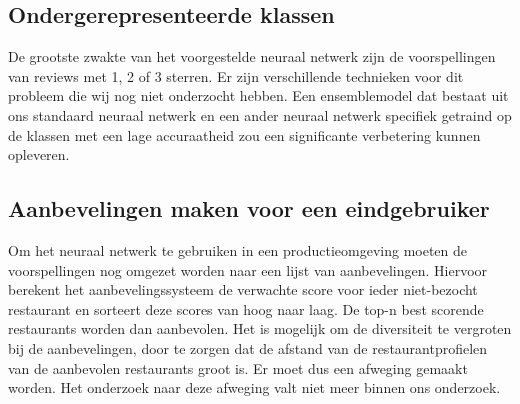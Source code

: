 \subsection*{Ondergerepresenteerde klassen}
De grootste zwakte van het voorgestelde neuraal netwerk zijn de voorspellingen van reviews met 1, 2 of 3 sterren. Er zijn verschillende technieken voor dit probleem die wij nog niet onderzocht hebben. Een ensemblemodel dat bestaat uit ons standaard neuraal netwerk en een ander neuraal netwerk specifiek getraind op de klassen met een lage accuraatheid zou een significante verbetering kunnen opleveren.

\subsection*{Aanbevelingen maken voor een eindgebruiker}
Om het neuraal netwerk te gebruiken in een productieomgeving moeten de voorspellingen nog omgezet worden naar een lijst van aanbevelingen. Hiervoor berekent het aanbevelingssysteem de verwachte score voor ieder niet-bezocht restaurant en sorteert deze scores van hoog naar laag. De top-n best scorende restaurants worden dan aanbevolen. Het is mogelijk om de diversiteit te vergroten bij de aanbevelingen, door te zorgen dat de afstand van de restaurantprofielen van de aanbevolen restaurants groot is. Er moet dus een afweging gemaakt worden. Het onderzoek naar deze afweging valt niet meer binnen ons onderzoek.


